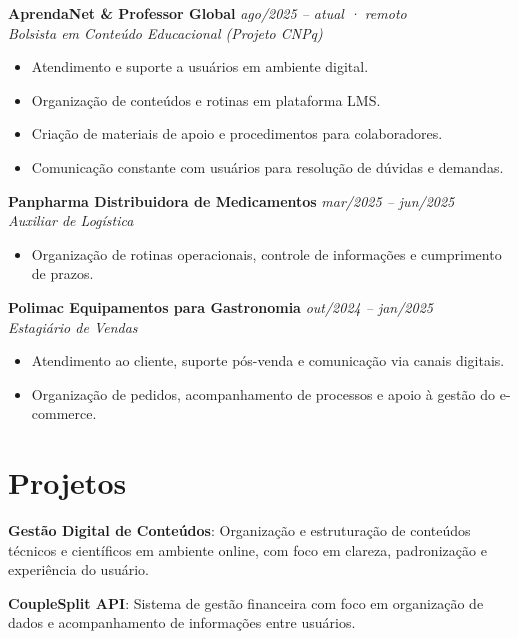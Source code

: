 \documentclass[11pt,a4paper]{article}
\begin{document}
\medskip

\textbf{AprendaNet \& Professor Global} \hfill \textit{ago/2025 -- atual · remoto}\\
\textit{Bolsista em Conteúdo Educacional (Projeto CNPq)}
\begin{itemize}
  \item Atendimento e suporte a usuários em ambiente digital.
  \item Organização de conteúdos e rotinas em plataforma LMS.
  \item Criação de materiais de apoio e procedimentos para colaboradores.
  \item Comunicação constante com usuários para resolução de dúvidas e demandas.
\end{itemize}

\medskip

\textbf{Panpharma Distribuidora de Medicamentos} \hfill \textit{mar/2025 -- jun/2025}\\
\textit{Auxiliar de Logística}
\begin{itemize}
  \item Organização de rotinas operacionais, controle de informações e cumprimento de prazos.
\end{itemize}

\medskip

\textbf{Polimac Equipamentos para Gastronomia} \hfill \textit{out/2024 -- jan/2025}\\
\textit{Estagiário de Vendas}
\begin{itemize}
  \item Atendimento ao cliente, suporte pós-venda e comunicação via canais digitais.
  \item Organização de pedidos, acompanhamento de processos e apoio à gestão do e-commerce.
\end{itemize}

\section{Projetos}

\textbf{Gestão Digital de Conteúdos}: Organização e estruturação de conteúdos técnicos e
científicos em ambiente online, com foco em clareza, padronização e experiência do usuário.

\medskip

\textbf{CoupleSplit API}: Sistema de gestão financeira com foco em organização de dados e
acompanhamento de informações entre usuários.
\end{document}
